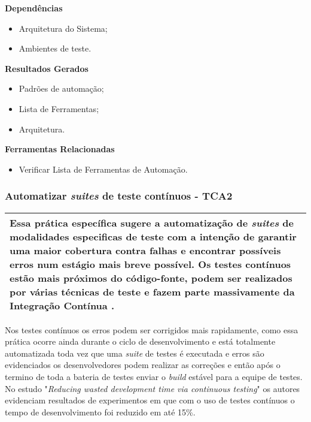 \textbf{Dependências}
\begin{itemize}
    \item Arquitetura do Sistema;
    \item Ambientes de teste.
\end{itemize}

\textbf{Resultados Gerados}
\begin{itemize}
    \item Padrões de automação;
    \item Lista de Ferramentas;
    \item Arquitetura.
\end{itemize}

\textbf{Ferramentas Relacionadas}
\begin{itemize}
    \item Verificar Lista de Ferramentas de Automação.
\end{itemize}

\subsubsection{Automatizar \textit{suites} de teste contínuos - TCA2}
\label{sec:tca2}

\begin{table}[H]
\centering
\begin{tabular}{|p{130mm}|}
\hline
Essa prática específica sugere a automatização de \textit{suites} de modalidades especificas de teste com a intenção de garantir uma maior cobertura contra falhas e encontrar possíveis erros num estágio mais breve possível. Os testes contínuos estão mais próximos do código-fonte, podem ser realizados por várias técnicas de teste e fazem parte massivamente da Integração Contínua \cite{BRAGA2015}.\\ 
\hline
\end{tabular}
\end{table}

Nos testes contínuos os erros podem ser corrigidos mais rapidamente, como essa prática ocorre ainda durante o ciclo de desenvolvimento e está totalmente automatizada toda vez que uma \textit{suite} de testes é executada e erros são evidenciados os desenvolvedores podem realizar as correções e então após o termino de toda a bateria de testes enviar o \textit{build} estável para a equipe de testes. No estudo "\textit{Reducing wasted development time via continuous testing}" \cite{salf2003} os autores evidenciam resultados de experimentos em que com o uso de testes contínuos o tempo de desenvolvimento foi reduzido em até 15\%.



